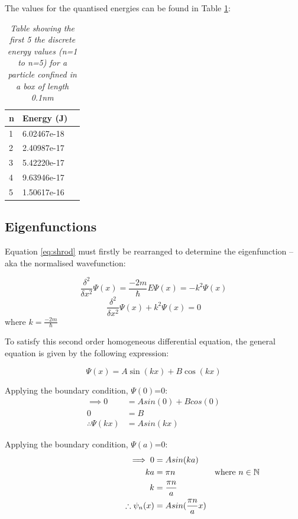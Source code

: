The values for the quantised energies can be found in Table \ref{tab:qEnerergy}:

\begin{table}[h!]
\centering
\begin{tabular}{|l|l|l|}
\hline
\textbf{n} & \textbf{Energy (J)} \\ \hline
1 & 6.02467e-18 \\ \hline
2 & 2.40987e-17 \\ \hline
3 & 5.42220e-17 \\ \hline
4 & 9.63946e-17 \\ \hline
5 & 1.50617e-16 \\ \hline
\end{tabular}
\caption{\textit{Table showing the first 5 the discrete energy values (n=1 to n=5) for a particle confined in a box of length 0.1nm}}
\label{tab:qEnerergy}
\end{table}

\subsection{Eigenfunctions}\label{sec:eigenFunction}
Equation \ref{eq:shrod} must firstly be rearranged to determine the eigenfunction -- aka the normalised wavefunction:

$$\frac{\delta^{2}}{\delta x^{2}}\Psi (x) = \frac{-2m}{\hbar} E \Psi (x) = -k^2 \Psi (x)$$
$$\frac{\delta^{2}}{\delta x^{2}}\Psi (x) + k^2 \Psi (x) = 0$$
where $k=\frac{-2m}{\hbar}$

To satisfy this second order homogeneous differential equation, the general equation is given by the following expression:

$$\Psi (x) = A \sin(kx) + B \cos(kx)$$

Applying the boundary condition, $\Psi (0)$=0:
\begin{align*}
\implies 0 &= A sin(0) + B cos(0)\\
 0 &= B\\
\therefore \Psi (kx) &= A sin(kx)
\end{align*}

Applying the boundary condition, $\Psi (a)$=0:
\begin{align*}
\hspace{3.5cm} \implies 0 &= A sin(ka)\\
ka &= \pi n & \text{where } n \in \mathbb{N}\\
k &= \frac{\pi n}{a}\\
\therefore \psi_n (x) &= A sin(\frac{\pi n}{a}x)
\end{align*}

